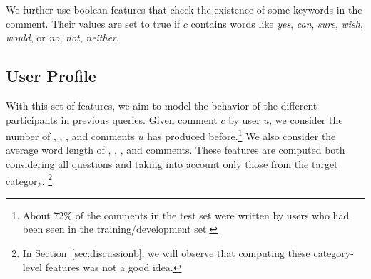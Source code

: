 We further use boolean features that check the existence of some keywords in the comment.
Their values are set to true if $c$ contains words like
\Ni \textit{yes}, \textit{can}, \textit{sure}, \textit{wish}, \textit{would}, or
\Nii \textit{no}, \textit{not}, \textit{neither}.


\subsection{User Profile}
\label{sub:profile}

With this set of features, we aim to model the behavior of the different 
participants in previous queries. Given comment $c$ by user $u$, we consider 
the number of \good, \bad, \pot, and \dial comments $u$ has produced 
before.\footnote{About 72\% of the comments in the test set were written by users who 
had been seen in the training/development set.}
We also consider the average word length of \good, \bad, \pot, and \dial 
comments. These features are computed both considering all questions and 
taking into account only those from the target category.
\footnote{In Section~\ref{sec:discussionb}, we will observe that computing 
these category-level features was not a good idea.}





